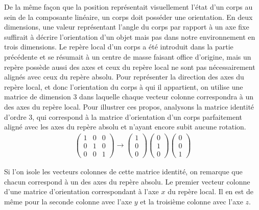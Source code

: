 De la même façon que la position représentait visuellement l'état d'un
corps au sein de la composante linéaire, un corps doit posséder une
orientation. En deux dimensions, une valeur représentant l'angle du
corps par rapport à un axe fixe suffirait à décrire l'orientation d'un
objet mais pas dans notre environnement en trois dimensions. Le repère
local d'un corps a été introduit dans la partie précédente et se
résumait à un centre de masse faisant office d'origine, mais un repère
possède aussi des axes et ceux du repère local ne sont pas
nécessairement alignés avec ceux du repère absolu. Pour représenter la
direction des axes du repère local, et donc l'orientation du corps à
qui il appartient, on utilise une matrice de dimension 3 dans laquelle
chaque vecteur colonne correspondra à un des axes du repère
local. Pour illustrer ces propos, analysons la matrice identité
d'ordre 3, qui correspond à la matrice d'orientation d'un corps
parfaitement aligné avec les axes du repère absolu et n'ayant encore
subit aucune rotation.
\begin{align*}
  \begin{pmatrix}
    1 & 0 & 0 \\ 0 & 1 & 0 \\ 0 & 0 & 1
  \end{pmatrix}
  \rightarrow
  \begin{pmatrix}
    1 \\ 0 \\ 0
  \end{pmatrix}
  \begin{pmatrix}
    0 \\ 1 \\ 0
  \end{pmatrix}
  \begin{pmatrix}
    0 \\ 0 \\ 1
  \end{pmatrix}
\end{align*}

Si l'on isole les vecteurs colonnes de cette matrice identité, on
remarque que chacun correspond à un des axes du repère absolu. Le
premier vecteur colonne d'une matrice d'orientation correspondant à
l'axe $x$ du repère local. Il en est de même pour la seconde colonne
avec l'axe $y$ et la troisième colonne avec l'axe $z$.


